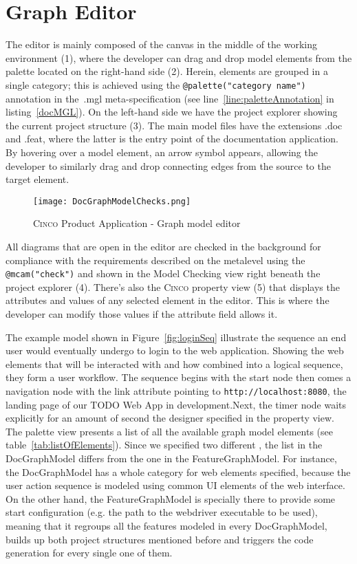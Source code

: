 \section{Graph Editor}\label{sec:graphEditor}

The editor is mainly composed of the canvas in the middle of the working environment (1), where the developer can drag and drop model elements from the palette located on the right-hand side (2). Herein, elements are grouped in a single category; this is achieved using the \lstinline[language=MGL]{@palette("category name")} annotation in the~.mgl meta-specification (see line~\ref{line:paletteAnnotation} in listing~\ref{docMGL}). On the left-hand side we have the project explorer showing the current project structure (3). The main model files have the extensions .doc and .feat, where the latter is the entry point of the documentation application. By hovering over a model element, an arrow symbol appears, allowing the developer to similarly drag and drop connecting edges from the source to the target element.

\begin{figure}[h]
    \centering
    \texttt{[image: DocGraphModelChecks.png]}
    \caption{\textsc{Cinco} Product Application - Graph model editor}\label{fig:graphDSL}
\end{figure}

All diagrams that are open in the editor are checked in the background for compliance with the requirements described on the metalevel using the \lstinline[language=MGL]{@mcam("check")} and shown in the Model Checking view right beneath the project explorer (4). There's also the \textsc{Cinco} property view (5) that displays the attributes and values of any selected element in the editor. This is where the developer can modify those values if the attribute field allows it.

The example model shown in Figure~\ref{fig:loginSeq} illustrate the sequence an end user would eventually undergo to login to the web application. Showing the web elements that will be interacted with and how combined into a logical sequence, they form a user workflow. The sequence begins with the start node then comes a navigation node with the link attribute pointing to \lstinline{http://localhost:8080}, the landing page of our TODO Web App in development.Next, the timer node waits explicitly for an amount of second the designer specified in the property view. The palette view presents a list of all the available graph model elements (see table~\ref{tab:listOfElements}). Since we specified two different , the list in the DocGraphModel differs from the one in the FeatureGraphModel. For instance, the DocGraphModel has a whole category for web elements specified, because the user action sequence is modeled using common UI elements of the web interface. On the other hand, the FeatureGraphModel is specially there to provide some start configuration (e.g. the path to the webdriver executable to be used), meaning that it regroups all the features modeled in every DocGraphModel, builds up both project structures mentioned before and triggers the code generation for every single one of them.

